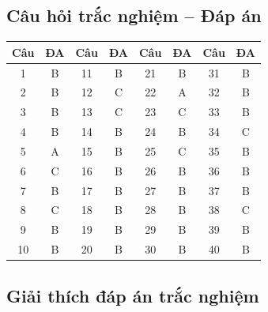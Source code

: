\documentclass[10pt]{article}
\begin{document}
\subsection*{Câu hỏi trắc nghiệm -- Đáp án}

\begin{singlespace}
\begin{longtable}{|c|c||c|c||c|c||c|c|}
\hline
\textbf{Câu} & \textbf{ĐA} & \textbf{Câu} & \textbf{ĐA} & \textbf{Câu} & \textbf{ĐA} & \textbf{Câu} & \textbf{ĐA} \\
\hline
\endhead
1  & B & 11 & B & 21 & B & 31 & B \\
\hline
2  & B & 12 & C & 22 & A & 32 & B \\
\hline
3  & B & 13 & C & 23 & C & 33 & B \\
\hline
4  & B & 14 & B & 24 & B & 34 & C \\
\hline
5  & A & 15 & B & 25 & C & 35 & B \\
\hline
6  & C & 16 & B & 26 & B & 36 & B \\
\hline
7  & B & 17 & B & 27 & B & 37 & B \\
\hline
8  & C & 18 & B & 28 & B & 38 & C \\
\hline
9  & B & 19 & B & 29 & B & 39 & B \\
\hline
10 & B & 20 & B & 30 & B & 40 & B \\
\hline
\end{longtable}
\end{singlespace}

\subsection*{Giải thích đáp án trắc nghiệm}
\end{document}
